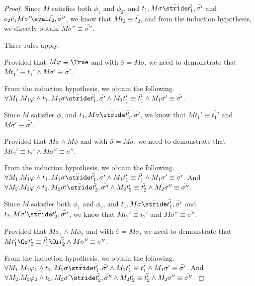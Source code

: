 \begin{proof}
{{    Since $M$ satisfies both $\phi_1$ and $\phi_2$, and $t_1,M\sigma \bar{\stride} \bar{t_1'},\bar{\sigma'}$ and $e_2\bar{v_1}M\sigma'\bar{\eval}\bar{t_2},\bar{\sigma''}$,
    we know that $M t_2\equiv\bar{t_2}$,
    and from the induction hypothesis, we directly obtain  $M\sigma''\equiv \bar{\sigma''}$.

    }
  }

  {
  Three rules apply.\\
    {Provided that $M\phi\equiv\True$ and  with $\bar{\sigma}=M\sigma$,
    we need to demonstrate that $M t_1'\equiv \bar{t_1'} \land M\sigma'\equiv \bar{\sigma'}$.

    From the induction hypothesis, we obtain the following.
    $\forall M_1 . M_1 \phi \land t_1,M_1\sigma \bar{\stride} \bar{t_1'},\bar{\sigma'}\land M_1 t_1'\equiv\bar{t_1'}\land M_1\sigma' \equiv \bar{\sigma'}$.

    Since $M$ satisfies $\phi$, and $t_1,M\sigma \bar{\stride} \bar{t_1'},\bar{\sigma'}$,
    we know that $M t_1'\equiv\bar{t_1'}$ and $M\sigma'\equiv \bar{\sigma'}$.

    }
    {Provided that $M\phi\land M\phi$ and  with $\bar{\sigma}=M\sigma$,
    we need to demonstrate that $M t_2'\equiv \bar{t_2'} \land M\sigma''\equiv \bar{\sigma''}$.

    From the induction hypothesis, we obtain the following.
    $\forall M_1 . M_1 \phi \land t_1,M_1\sigma \bar{\stride} \bar{t_1'},\bar{\sigma'}\land M_1 t_1'\equiv\bar{t_1'}\land M_1\sigma' \equiv \bar{\sigma'}$. And \\
    $\forall M_2 . M_2 \phi \land t_2,M_2\sigma' \bar{\stride} \bar{t_2'},\bar{\sigma''}\land M_2 t_2'\equiv\bar{t_2'}\land M_2\sigma'' \equiv \bar{\sigma''}$.

    Since $M$ satisfies both $\phi_1$ and $\phi_2$, and $t_1,M\sigma \bar{\stride} \bar{t_1'},\bar{\sigma'}$ and $t_2,M\sigma'\bar{\stride}\bar{t_2'},\bar{\sigma''}$,
    we know that $M t_2'\equiv\bar{t_2'}$ and $M\sigma''\equiv \bar{\sigma''}$.

    }
    {Provided that $M\phi_1\land M\phi_2$ and  with $\bar{\sigma}=M\sigma$,
    we need to demonstrate that $M t_1'\Or t_2'\equiv \bar{t_1'}\Or\bar{t_2'} \land M\sigma''\equiv \bar{\sigma''}$.

    From the induction hypothesis, we obtain the following.
    $\forall M_1 . M_1 \phi_1 \land t_1,M_1\sigma \bar{\stride} \bar{t_1'},\bar{\sigma'}\land M_1 t_1'\equiv\bar{t_1'}\land M_1\sigma' \equiv \bar{\sigma'}$. And \\
    $\forall M_2 . M_2 \phi_2 \land t_2,M_2\sigma' \bar{\stride} \bar{t_2'},\bar{\sigma''}\land M_2 t_2'\equiv\bar{t_2'}\land M_2\sigma'' \equiv \bar{\sigma''}$.

}}
\end{proof}
